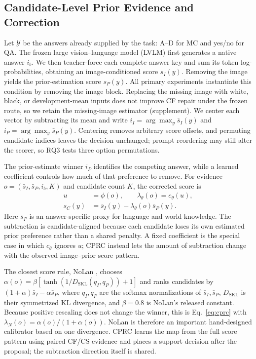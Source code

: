 \documentclass[letterpaper]{article}
\begin{document}
\subsection{Candidate-Level Prior Evidence and Correction}

Let $\mathcal{Y}$ be the answers already supplied by the task: A--D for MC and
yes/no for QA. The frozen large vision--language model (LVLM) first generates a
native answer $i_b$. We then teacher-force each complete answer key and sum its
token log-probabilities, obtaining an image-conditioned score $s_I(y)$.
Removing the image yields the prior-estimation score $s_P(y)$. All
primary experiments instantiate this condition by removing the image block.
Replacing the missing image with white, black, or development-mean inputs does
not improve CF repair under the frozen route, so we retain the missing-image
estimator (supplement).
We center each vector by subtracting its mean and write
$i_I=\arg\max_y\bar s_I(y)$ and $i_P=\arg\max_y\bar s_P(y)$. Centering removes
arbitrary score offsets, and permuting candidate indices leaves the decision
unchanged; prompt reordering may still alter the scorer, so RQ3 tests three
option permutations.

The prior-estimate winner $i_P$ identifies the competing answer, while a learned
coefficient controls how much of that preference to remove. For evidence
$o=(\bar s_I,\bar s_P,i_b,K)$ and candidate count $K$, the corrected score is
\begin{align}
u&=\phi(o),\qquad \lambda_\theta(o)=c_\theta(u),\nonumber\\
s_C(y)&=\bar s_I(y)-\lambda_\theta(o)\bar s_P(y).
\label{eq:cprc}
\end{align}
Here $\bar s_P$ is an answer-specific proxy for language and world knowledge.
The subtraction is candidate-aligned
because each candidate loses its own estimated prior preference rather than a shared
penalty. A fixed coefficient is the special case in which $c_\theta$ ignores
$u$; CPRC instead lets the amount of subtraction change with the observed
image--prior score pattern.

The closest score rule, NoLan \cite{ren2026nolan}, chooses
$\alpha(o)=\beta[\tanh(1/D_{\mathrm{SKL}}(q_I,q_P))+1]$ and ranks candidates by
$(1+\alpha)\bar s_I-\alpha\bar s_P$, where $q_I,q_P$ are the softmax
normalizations of $\bar s_I,\bar s_P$, $D_{\mathrm{SKL}}$ is their symmetrized
KL divergence, and $\beta=0.8$ is NoLan's released constant. Because positive rescaling does not change
the winner, this is Eq.~\ref{eq:cprc} with
$\lambda_N(o)=\alpha(o)/(1+\alpha(o))$. NoLan is therefore an important
hand-designed calibrator based on one divergence. CPRC learns the map from the
full score pattern using paired CF/CS evidence and places a support decision
after the proposal; the subtraction direction itself is shared.
\end{document}
